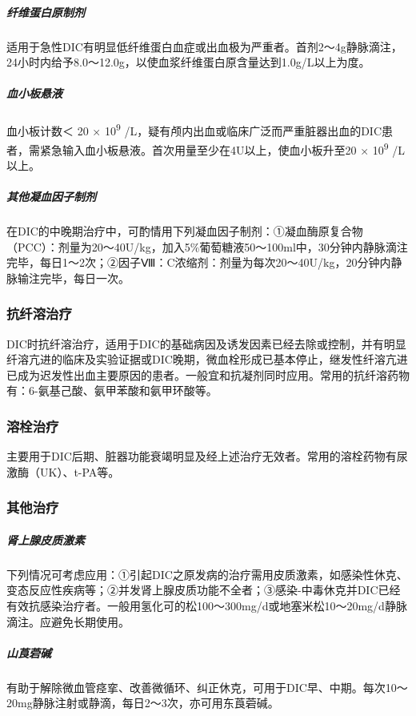\subparagraph{纤维蛋白原制剂}

适用于急性DIC有明显低纤维蛋白血症或出血极为严重者。首剂2～4g静脉滴注，24小时内给予8.0～12.0g，以使血浆纤维蛋白原含量达到1.0g/L以上为度。

\subparagraph{血小板悬液}

血小板计数＜ 20 × 10\textsuperscript{9}
/L，疑有颅内出血或临床广泛而严重脏器出血的DIC患者，需紧急输入血小板悬液。首次用量至少在4U以上，使血小板升至20
× 10\textsuperscript{9} /L以上。

\subparagraph{其他凝血因子制剂}

在DIC的中晚期治疗中，可酌情用下列凝血因子制剂：①凝血酶原复合物（PCC）：剂量为20～40U/kg，加入5\%葡萄糖液50～100ml中，30分钟内静脉滴注完毕，每日1～2次；②因子Ⅷ：C浓缩剂：剂量为每次20～40U/kg，20分钟内静脉输注完毕，每日一次。

\subsubsection{抗纤溶治疗}

DIC时抗纤溶治疗，适用于DIC的基础病因及诱发因素已经去除或控制，并有明显纤溶亢进的临床及实验证据或DIC晚期，微血栓形成已基本停止，继发性纤溶亢进已成为迟发性出血主要原因的患者。一般宜和抗凝剂同时应用。常用的抗纤溶药物有：6-氨基己酸、氨甲苯酸和氨甲环酸等。

\subsubsection{溶栓治疗}

主要用于DIC后期、脏器功能衰竭明显及经上述治疗无效者。常用的溶栓药物有尿激酶（UK）、t-PA等。

\subsubsection{其他治疗}

\subparagraph{肾上腺皮质激素}

下列情况可考虑应用：①引起DIC之原发病的治疗需用皮质激素，如感染性休克、变态反应性疾病等；②并发肾上腺皮质功能不全者；③感染-中毒休克并DIC已经有效抗感染治疗者。一般用氢化可的松100～300mg/d或地塞米松10～20mg/d静脉滴注。应避免长期使用。

\subparagraph{山莨菪碱}

有助于解除微血管痉挛、改善微循环、纠正休克，可用于DIC早、中期。每次10～20mg静脉注射或静滴，每日2～3次，亦可用东莨菪碱。

\protect\hypertarget{text00088.html}{}{}

